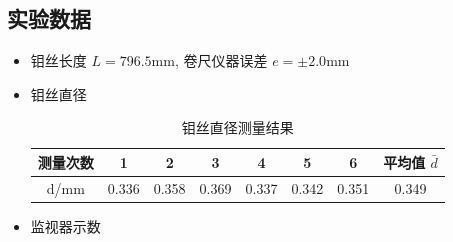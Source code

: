 \documentclass[zihao=5, UTF8]{article}
\theoremstyle{MyLineTheoremStyle} %
\theoremstyle{MyBlockTheoremStyle} %
\theoremstyle{MySubsubsectionStyle} %
\begin{document}
\subsection{实验数据}
\begin{itemize}
    \item 钼丝长度 $L = 796.5$mm, 卷尺仪器误差 $e = \pm 2.0$mm
    \item 钼丝直径
        \begin{table}[H]
            \centering
            \begin{tabular}{|cccccccc|}
                \hline
                测量次数 & 1 & 2 & 3 & 4 & 5 & 6 & 平均值 $\bar{d}$ \\
                \hline
                d/mm & 0.336 & 0.358 & 0.369 & 0.337 & 0.342 & 0.351 & 0.349 \\
                \hline
            \end{tabular}
            \caption{钼丝直径测量结果}
        \end{table}
    \item 监视器示数
        

\end{itemize}
\end{document}
